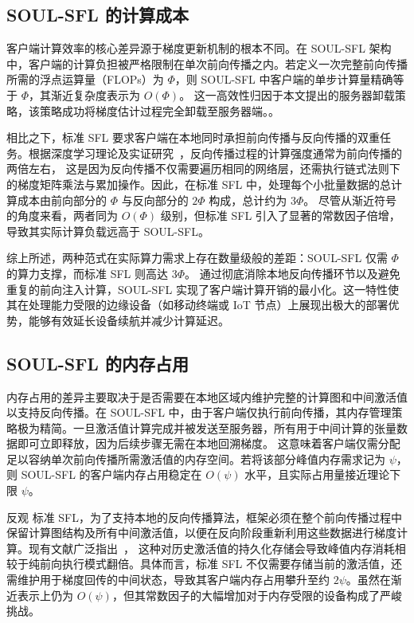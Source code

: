 \subsection{SOUL-SFL 的计算成本}\label{sec:computation}

客户端计算效率的核心差异源于梯度更新机制的根本不同。在 SOUL-SFL 架构中，客户端的计算负担被严格限制在单次前向传播之内。若定义一次完整前向传播所需的浮点运算量（FLOPs）为 $\Phi$，则 SOUL-SFL 中客户端的单步计算量精确等于 $\Phi$，其渐近复杂度表示为 $O(\Phi)$。
这一高效性归因于本文提出的服务器卸载策略，该策略成功将梯度估计过程完全卸载至服务器端。。

相比之下，标准 SFL 要求客户端在本地同时承担前向传播与反向传播的双重任务。根据深度学习理论及实证研究~\cite{rumelhart1986learning,goodfellow2016deep}，反向传播过程的计算强度通常为前向传播的两倍左右，
这是因为反向传播不仅需要遍历相同的网络层，还需执行链式法则下的梯度矩阵乘法与累加操作。因此，在标准 SFL 中，处理每个小批量数据的总计算成本由前向部分的 $\Phi$ 与反向部分的 $2\Phi$ 构成，总计约为 $3\Phi$。
尽管从渐近符号的角度来看，两者同为 $O(\Phi)$ 级别，但标准 SFL 引入了显著的常数因子倍增，导致其实际计算负载远高于 SOUL-SFL。

综上所述，两种范式在实际算力需求上存在数量级般的差距：SOUL-SFL 仅需 $\Phi$ 的算力支撑，而标准 SFL 则高达 $3\Phi$。
通过彻底消除本地反向传播环节以及避免重复的前向注入计算，SOUL-SFL 实现了客户端计算开销的最小化。这一特性使其在处理能力受限的边缘设备（如移动终端或 IoT 节点）上展现出极大的部署优势，能够有效延长设备续航并减少计算延迟。

\subsection{SOUL-SFL 的内存占用}\label{sec:memory}

内存占用的差异主要取决于是否需要在本地区域内维护完整的计算图和中间激活值以支持反向传播。在 SOUL-SFL 中，由于客户端仅执行前向传播，其内存管理策略极为精简。一旦激活值计算完成并被发送至服务器，所有用于中间计算的张量数据即可立即释放，因为后续步骤无需在本地回溯梯度。
这意味着客户端仅需分配足以容纳单次前向传播所需激活值的内存空间。若将该部分峰值内存需求记为 $\psi$，则 SOUL-SFL 的客户端内存占用稳定在 $O(\psi)$ 水平，且实际占用量接近理论下限 $\psi$。

反观 标准 SFL，为了支持本地的反向传播算法，框架必须在整个前向传播过程中保留计算图结构及所有中间激活值，以便在反向阶段重新利用这些数据进行梯度计算。现有文献广泛指出~\cite{chen2016training,goodfellow2016deep,rhu2016vdnn}，
这种对历史激活值的持久化存储会导致峰值内存消耗相较于纯前向执行模式翻倍。具体而言，标准 SFL 不仅需要存储当前的激活值，还需维护用于梯度回传的中间状态，导致其客户端内存占用攀升至约 $2\psi$。虽然在渐近表示上仍为 $O(\psi)$，但其常数因子的大幅增加对于内存受限的设备构成了严峻挑战。

